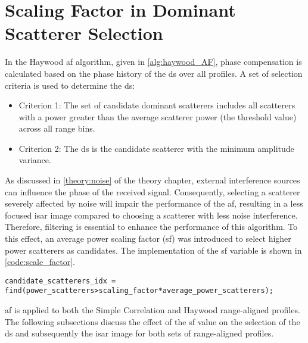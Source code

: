 \documentclass[class=report,11pt,crop=false]{standalone}
\begin{document}
\section{Scaling Factor in Dominant Scatterer Selection \label{apndxA:scale_factor_effect}}
In the Haywood \gls{af} algorithm, given in \autoref{alg:haywood_AF}, phase compensation is calculated based on the phase history of the \gls{ds} over all profiles. A set of selection criteria is used to determine the \gls{ds}:
\begin{itemize}
    \item Criterion 1: The set of candidate dominant scatterers includes all scatterers with a power greater than the average scatterer power (the threshold value) across all range bins.
    \item Criterion 2: The \gls{ds} is the candidate scatterer with the minimum amplitude variance.
\end{itemize}
As discussed in \autoref{theory:noise} of the theory chapter, external interference sources can influence the phase of the received signal. Consequently, selecting a scatterer severely affected by noise will impair the performance of the \gls{af}, resulting in a less focused \gls{isar} image compared to choosing a scatterer with less noise interference. Therefore, filtering is essential to enhance the performance of this algorithm. To this effect, an average power scaling factor (sf) was introduced to select higher power scatterers as candidates. 
The implementation of the sf variable is shown in \autoref{code:scale_factor}.
\begin{lstlisting}[caption={\textsc{Matlab} code for selecting candidate dominant scatterers.},label={code:scale_factor}]
candidate_scatterers_idx = find(power_scatterers>scaling_factor*average_power_scatterers);
\end{lstlisting}
\gls{af} is applied to both the Simple Correlation and Haywood range-aligned profiles. The following subsections discuss the effect of the sf value on the selection of the \gls{ds} and subsequently the \gls{isar} image for both sets of range-aligned profiles.
\end{document}
